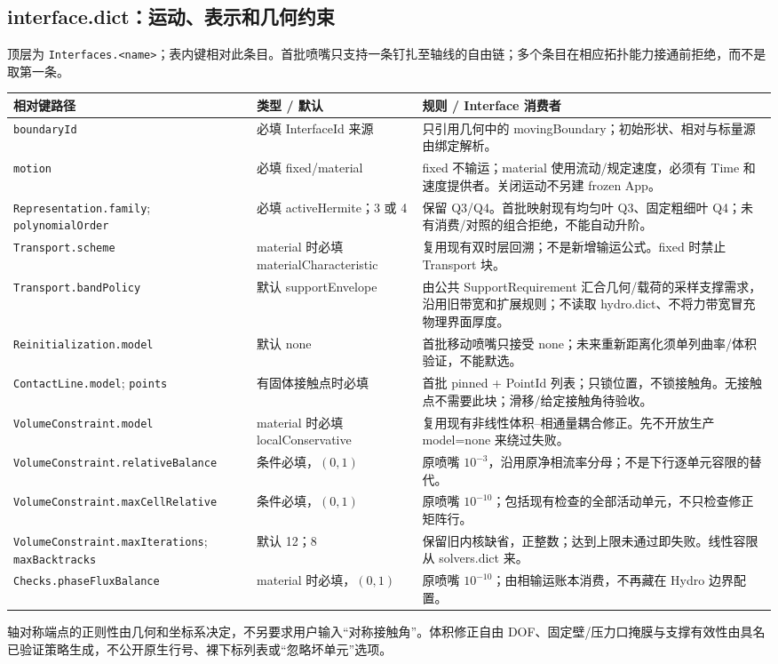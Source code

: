 \documentclass[UTF8,a4paper,11pt,fontset=fandol]{ctexart}
\numberwithin{equation}{section}
\newcommand{\code}[1]{\nolinkurl{#1}}
\begin{document}
\subsection{interface.dict：运动、表示和几何约束}
顶层为 \code{Interfaces.<name>}；表内键相对此条目。首批喷嘴只支持一条钉扎至轴线的自由链；多个条目在相应拓扑能力接通前拒绝，而不是取第一条。
\begin{longtable}{@{}P{.36\textwidth}P{.23\textwidth}P{.35\textwidth}@{}}
\toprule 相对键路径 & 类型 / 默认 & 规则 / Interface 消费者\\\midrule\endhead
\code{boundaryId} & 必填 InterfaceId 来源 & 只引用几何中的 movingBoundary；初始形状、相对与标量源由绑定解析。\\
\code{motion} & 必填 fixed/material & fixed 不输运；material 使用流动/规定速度，必须有 Time 和速度提供者。关闭运动不另建 frozen App。\\
\code{Representation.family}; \code{polynomialOrder} & 必填 activeHermite；3 或 4 & 保留 Q3/Q4。首批映射现有均匀叶 Q3、固定粗细叶 Q4；未有消费/对照的组合拒绝，不能自动升阶。\\
\code{Transport.scheme} & material 时必填 materialCharacteristic & 复用现有双时层回溯；不是新增输运公式。fixed 时禁止 Transport 块。\\
\code{Transport.bandPolicy} & 默认 supportEnvelope & 由公共 SupportRequirement 汇合几何/载荷的采样支撑需求，沿用旧带宽和扩展规则；不读取 hydro.dict、不将力带宽冒充物理界面厚度。\\
\code{Reinitialization.model} & 默认 none & 首批移动喷嘴只接受 none；未来重新距离化须单列曲率/体积验证，不能默选。\\
\code{ContactLine.model}; \code{points} & 有固体接触点时必填 & 首批 pinned + PointId 列表；只锁位置，不锁接触角。无接触点不需要此块；滑移/给定接触角待验收。\\
\code{VolumeConstraint.model} & material 时必填 localConservative & 复用现有非线性体积--相通量耦合修正。先不开放生产 model=none 来绕过失败。\\
\code{VolumeConstraint.relativeBalance} & 条件必填，$(0,1)$ & 原喷嘴 $10^{-3}$，沿用原净相流率分母；不是下行逐单元容限的替代。\\
\code{VolumeConstraint.maxCellRelative} & 条件必填，$(0,1)$ & 原喷嘴 $10^{-10}$；包括现有检查的全部活动单元，不只检查修正矩阵行。\\
\code{VolumeConstraint.maxIterations}; \code{maxBacktracks} & 默认 12；8 & 保留旧内核缺省，正整数；达到上限未通过即失败。线性容限从 solvers.dict 来。\\
\code{Checks.phaseFluxBalance} & material 时必填，$(0,1)$ & 原喷嘴 $10^{-10}$；由相输运账本消费，不再藏在 Hydro 边界配置。\\
\bottomrule
\end{longtable}
轴对称端点的正则性由几何和坐标系决定，不另要求用户输入“对称接触角”。体积修正自由 DOF、固定壁/压力口掩膜与支撑有效性由具名已验证策略生成，不公开原生行号、裸下标列表或“忽略坏单元”选项。
\end{document}

